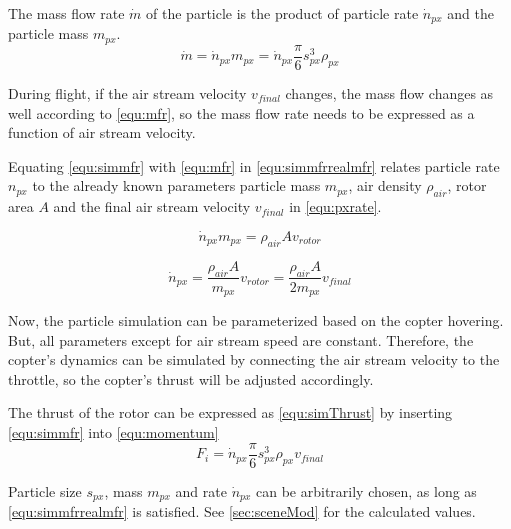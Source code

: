     The mass flow rate $\dot m$ of the particle is the product of particle rate $\dot n_{px}$ and the particle mass $m_{px}$.
    \begin{equation}
    \dot m =  \dot n_{px} m_{px}= \dot n_{px}  \frac{\pi}{6}s_{px}^3  \rho_{px}
    \label{equ:simmfr}
    \end{equation}
    
    During flight, if the air stream velocity $v_{final}$ changes, the mass flow changes as well according to \ref{equ:mfr}, so the mass flow rate needs to be expressed as a function of air stream velocity. 
    
    Equating \ref{equ:simmfr} with  \ref{equ:mfr} in \ref{equ:simmfrrealmfr} relates particle rate $n_{px}$ to the already known parameters particle mass $m_{px}$, air density $\rho_{air}$, rotor area $A$ and the final air stream velocity $v_{final}$ in \ref{equ:pxrate}.
    
    \begin{equation}
    \dot n_{px} m_{px} =  \rho_{air} A v_{rotor}
    \label{equ:simmfrrealmfr}
    \end{equation}
    
    \begin{equation}
    \dot n_{px} = \frac{\rho_{air} A}{m_{px}} v_{rotor} = \frac{\rho_{air} A}{2m_{px}} v_{final}
    \label{equ:pxrate}
    \end{equation}
    
    Now, the particle simulation can be parameterized based on the copter hovering. 
    But, all parameters except for air stream speed are constant.
    Therefore,  the copter's dynamics can be simulated by connecting the air stream velocity to the throttle, so the copter's thrust will be adjusted accordingly.
    
    The thrust of the rotor can be expressed as \ref{equ:simThrust} by inserting \ref{equ:simmfr} into \ref{equ:momentum}
    \begin{equation}
    F_i = \dot n_{px}  \frac{\pi}{6}s_{px}^3  \rho_{px} v_{final}
    \label{equ:simThrust}
    \end{equation}
    
    Particle size $s_{px}$, mass $m_{px}$ and rate $\dot n_{px}$ can be arbitrarily chosen, as long as \ref{equ:simmfrrealmfr} is satisfied. See \ref{sec:sceneMod} for the calculated values.
    
    

    

    
